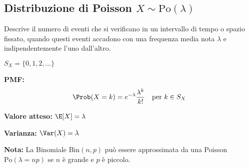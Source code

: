 \subsection{Distribuzione di Poisson \texorpdfstring{$X \sim \text{Po}(\lambda)$}{X ~ Po(lambda)}}
Descrive il numero di eventi che si verificano in un intervallo di tempo o spazio fissato, quando questi eventi accadono con una frequenza media nota $\lambda$ e indipendentemente l'uno dall'altro.

$S_X = \{0, 1, 2, \dots\}$

\textbf{PMF:} 
\[ \Prob(X=k) = e^{-\lambda} \frac{\lambda^k}{k!} \quad \text{per } k \in S_X \]

\textbf{Valore atteso:} $\E[X] = \lambda$

\textbf{Varianza:} $\Var(X) = \lambda$

\textbf{Nota:} La Binomiale $\text{Bin}(n,p)$ può essere approssimata da una Poisson $\text{Po}(\lambda=np)$ se $n$ è grande e $p$ è piccolo.


